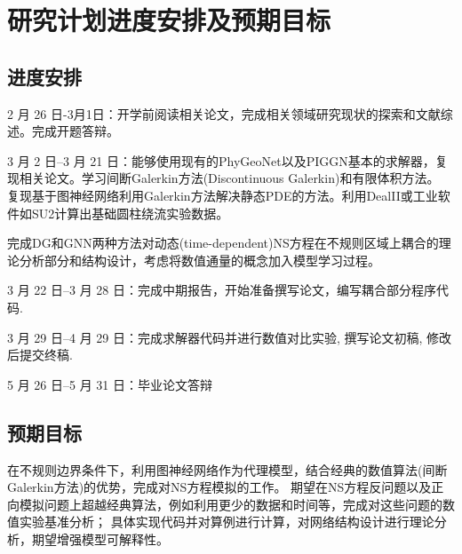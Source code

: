 \section{研究计划进度安排及预期目标}
\subsection{进度安排}
2 月 26 日-3月1日：开学前阅读相关论文，完成相关领域研究现状的探索和文献综述。完成开题答辩。

3 月 2 日–3 月 21 日：能够使用现有的PhyGeoNet以及PIGGN基本的求解器，复现相关论文。学习间断Galerkin方法(Discontinuous Galerkin)和有限体积方法。
复现基于图神经网络利用Galerkin方法解决静态PDE的方法。利用DealII或工业软件如SU2计算出基础圆柱绕流实验数据。

完成DG和GNN两种方法对动态(time-dependent)NS方程在不规则区域上耦合的理论分析部分和结构设计，考虑将数值通量的概念加入模型学习过程。

3 月 22 日–3 月 28 日：完成中期报告，开始准备撰写论文，编写耦合部分程序代码.

3 月 29 日–4 月 29 日：完成求解器代码并进行数值对比实验, 撰写论文初稿, 修改后提交终稿.

5 月 26 日–5 月 31 日：毕业论文答辩

\subsection{预期目标}
在不规则边界条件下，利用图神经网络作为代理模型，结合经典的数值算法(间断Galerkin方法)的优势，完成对NS方程模拟的工作。
期望在NS方程反问题以及正向模拟问题上超越经典算法，例如利用更少的数据和时间等，完成对这些问题的数值实验基准分析；
具体实现代码并对算例进行计算，对网络结构设计进行理论分析，期望增强模型可解释性。

\newpage
% 
% 

\begingroup
    \printbibliography[title={参考文献}]
\endgroup